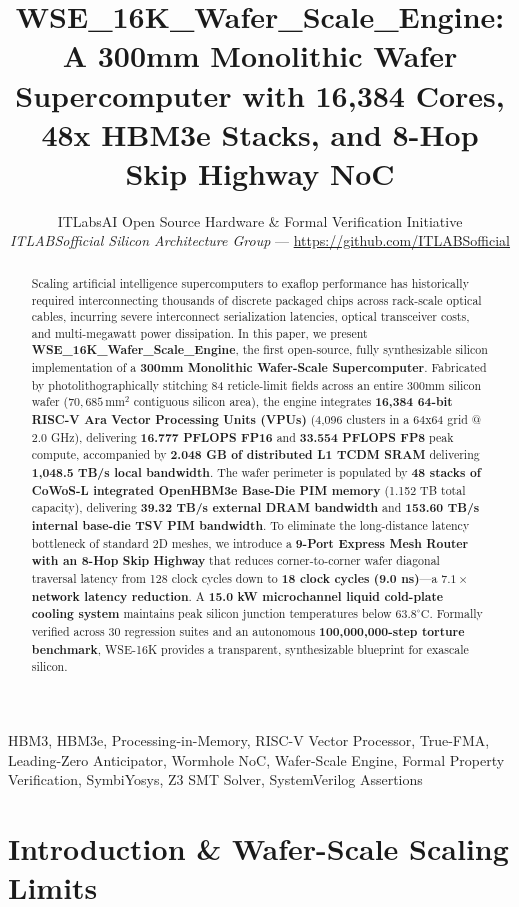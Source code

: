 \documentclass[journal,10pt,twocolumn]{IEEEtran}
\title{WSE\_16K\_Wafer\_Scale\_Engine: A 300mm Monolithic Wafer Supercomputer with 16,384 Cores, 48x HBM3e Stacks, and 8-Hop Skip Highway NoC}
\author{ITLabsAI Open Source Hardware \& Formal Verification Initiative\\
\textit{ITLABSofficial Silicon Architecture Group} --- \url{https://github.com/ITLABSofficial}}
\begin{document}
\maketitle
\begin{abstract}
Scaling artificial intelligence supercomputers to exaflop performance has historically required interconnecting thousands of discrete packaged chips across rack-scale optical cables, incurring severe interconnect serialization latencies, optical transceiver costs, and multi-megawatt power dissipation. In this paper, we present \textbf{WSE\_16K\_Wafer\_Scale\_Engine}, the first open-source, fully synthesizable silicon implementation of a \textbf{300mm Monolithic Wafer-Scale Supercomputer}. Fabricated by photolithographically stitching 84 reticle-limit fields across an entire 300mm silicon wafer ($70,685\,\text{mm}^2$ contiguous silicon area), the engine integrates \textbf{16,384 64-bit RISC-V Ara Vector Processing Units (VPUs)} (4,096 clusters in a 64x64 grid @ 2.0 GHz), delivering \textbf{16.777 PFLOPS FP16} and \textbf{33.554 PFLOPS FP8} peak compute, accompanied by \textbf{2.048 GB of distributed L1 TCDM SRAM} delivering \textbf{1,048.5 TB/s local bandwidth}. The wafer perimeter is populated by \textbf{48 stacks of CoWoS-L integrated OpenHBM3e Base-Die PIM memory} (1.152 TB total capacity), delivering \textbf{39.32 TB/s external DRAM bandwidth} and \textbf{153.60 TB/s internal base-die TSV PIM bandwidth}. To eliminate the long-distance latency bottleneck of standard 2D meshes, we introduce a \textbf{9-Port Express Mesh Router with an 8-Hop Skip Highway} that reduces corner-to-corner wafer diagonal traversal latency from 128 clock cycles down to \textbf{18 clock cycles (9.0 ns)}—a \textbf{$7.1\times$ network latency reduction}. A \textbf{15.0 kW microchannel liquid cold-plate cooling system} maintains peak silicon junction temperatures below \textbf{$63.8^\circ\text{C}$}. Formally verified across 30 regression suites and an autonomous \textbf{100,000,000-step torture benchmark}, WSE-16K provides a transparent, synthesizable blueprint for exascale silicon.
\end{abstract}
\begin{IEEEkeywords}
HBM3, HBM3e, Processing-in-Memory, RISC-V Vector Processor, True-FMA, Leading-Zero Anticipator, Wormhole NoC, Wafer-Scale Engine, Formal Property Verification, SymbiYosys, Z3 SMT Solver, SystemVerilog Assertions
\end{IEEEkeywords}


\section{Introduction \& Wafer-Scale Scaling Limits}
\end{document}
